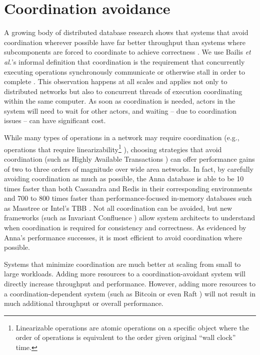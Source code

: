 \documentclass[8pt,fleqn,openany]{book}
\begin{document}
\section{Coordination avoidance}\label{sec:coordination-avoidance}

A growing body of distributed database research shows that systems that
avoid coordination wherever possible have far better throughput than systems
where subcomponents are forced to coordinate to achieve correctness
\cite{cap1, cap2, consistency-vs-latency, hat, i-confluence, anna,
calm1, calm2}.
We use Bailis {\em et al.}'s informal definition
that coordination is the requirement that concurrently executing operations
synchronously communicate or otherwise stall in order to complete
\cite{i-confluence}.
This observation happens at all scales and applies not only to distributed
networks but also to
concurrent threads of execution coordinating within the same computer.
As soon as coordination is needed, actors in the system will need to wait for
other actors, and waiting -- due to coordination issues -- can have significant
cost.

While many types of operations in a network may require coordination
(e.g., operations that require linearizability\footnote{
Linearizable operations are atomic operations on a specific object where
the order of operations is equivalent to the order given original ``wall clock''
time.
}
\cite{jepsen-consistency, hat, vv-consistency}), choosing strategies that
avoid coordination (such as Highly Available Transactions \cite{hat}) can offer
performance gains of two to three orders of magnitude over wide area networks.
In fact, by carefully avoiding coordination as much as possible, the Anna
database is able to be 10 times faster than both Cassandra and Redis in their
corresponding environments and 700 to 800 times faster than
performance-focused in-memory databases such as Masstree or Intel's TBB
\cite{anna, anna-announce}.
Not all coordination can be avoided, but new frameworks (such as Invariant
Confluence \cite{i-confluence}) allow system architects to understand when
coordination is required for consistency and correctness. As evidenced
by Anna's performance successes, it is most efficient to avoid coordination
where possible.

Systems that minimize coordination are
much better at scaling from small
to large workloads. Adding more resources to a coordination-avoidant system
will directly increase throughput and performance. However,
adding more resources to a coordination-dependent system
(such as Bitcoin \cite{bitcoin} or even Raft \cite{raft}) will not result in
much additional throughput or overall performance.
\end{document}
